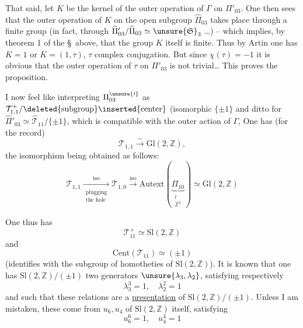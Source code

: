 
That said, let $K$ be the kernel of the outer operation of $\Gamma$ on $\Pi'_{03}$. One then sees that  the outer operation of $K$ on the open subgroup $\widehat{\Pi}_{03}$ takes place through a finite group (in fact, through  $\widehat{\Pi}'_{03}/\widehat{\Pi}_{03}\simeq\unsure{\mathfrak S}_3$ \ldots) -- which implies, by theorem 1 of the \S\ above, that the group $K$ itself is finite. Thus by Artin one has $K=1$ or $K=(1,\tau)$, $\tau$ complex conjugation. But since $\chi(\tau)=-1$ it is obvious that the outer operation of $\tau$ on $\Pi'_{03}$  is not trivial\ldots
{}
 This proves the proposition.


I now feel like interpreting $\Pi_{03}^{\unsure{\prime}}$ as $\mathcal T^+_{1,1}/\deleted{\text{subgroup}}\inserted{\text{center}}$ (isomorphic  $\{\pm1\}$\unsure{),|,} and ditto for $\widehat{\Pi}'_{03}\simeq\widehat{\mathcal T}_{11}/\{\pm1\}$,  which is compatible with the outer action of $\Gamma$, One has (for the record)
\[
\tag{10}
\mathcal T_{1,1}\xrightarrow{\sim}\mathrm{Gl}(2,\mathbb Z),
\]
the isomorphism being obtained as follows:
\[
\tag{11}
\mathcal T_{1,1}\xrightarrow[\substack{\text{plugging}\\\text{the hole}}]{\mathrm{iso}}\mathcal T_{1,0}\xrightarrow{\mathrm{iso}}\mathrm{Autext}\left(\underbrace{\Pi_{10}}_{\substack{\wr\\\mathbb Z^2}}\right)\simeq\mathrm{Gl}(2,\mathbb Z)
\]

One thus has
\[
\tag{12}
\mathcal T^+_{11}\simeq\mathrm{Sl}(2,\mathbb Z)
\]
and
\[
\tag{13}
\mathrm{Cent}(\mathcal T_{11})\simeq(\pm1)
\]
(identifies with the subgroup of homotheties of $\mathrm{Sl}(2,\mathbb Z)$). It is known that one has  $\mathrm{Sl}(2,\mathbb Z)/(\pm1)$ two generators $\unsure{\lambda_3,\lambda_2}$, satisfying respectively
\[
\tag{14}
\lambda_3^3=1,\quad\lambda_2^2=1
\]
and such that these relations are a \uline{presentation} of $\mathrm{Sl}(2,\mathbb Z)/(\pm1)$. Unless I am mistaken, these  come from  $u_6,u_4$ of $\mathrm{Sl}(2,\mathbb Z)$ itself, satisfying
\[
\tag{15}
u_6^6=1,\quad u_4^4=1
\]

